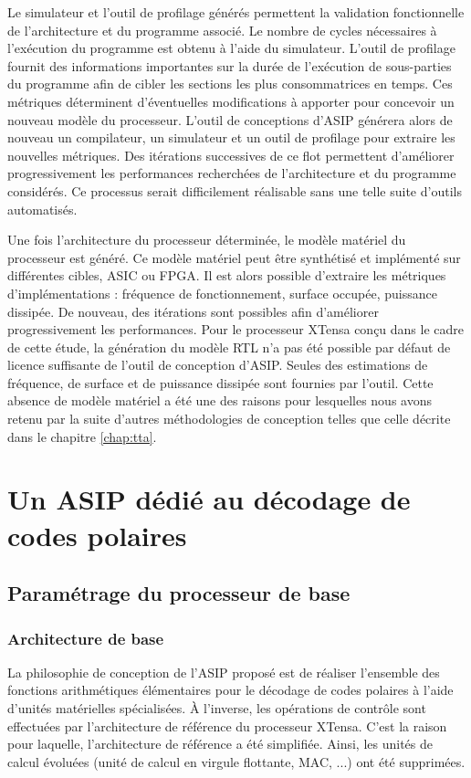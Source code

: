 Le simulateur et l'outil de profilage générés permettent la validation fonctionnelle de l'architecture et du programme associé. Le nombre de cycles nécessaires à l'exécution du programme est obtenu à l'aide du simulateur. L'outil de profilage fournit des informations importantes sur la durée de l'exécution de sous-parties du programme afin de cibler les sections les plus consommatrices en temps. Ces métriques déterminent d'éventuelles modifications à apporter pour concevoir un nouveau modèle du processeur. L'outil de conceptions d'ASIP générera alors de nouveau un compilateur, un simulateur et un outil de profilage pour extraire les nouvelles métriques. Des itérations successives de ce flot permettent d'améliorer progressivement les performances recherchées de l'architecture et du programme considérés. Ce processus serait difficilement réalisable sans une telle suite d'outils automatisés.

Une fois l'architecture du processeur déterminée, le modèle matériel du processeur est généré. Ce modèle matériel peut être synthétisé et implémenté sur différentes cibles, ASIC ou FPGA. Il est alors possible d'extraire les métriques d'implémentations : fréquence de fonctionnement, surface occupée, puissance dissipée. De nouveau, des itérations sont possibles afin d'améliorer progressivement les performances.
Pour le processeur XTensa conçu dans le cadre de cette étude, la génération du modèle RTL n'a pas été possible par défaut de licence suffisante de l'outil de conception d'ASIP. Seules des estimations de fréquence, de surface et de puissance dissipée sont fournies par l'outil. Cette absence de modèle matériel a été une des raisons pour lesquelles nous avons retenu par la suite d'autres méthodologies de conception telles que celle décrite dans le chapitre \ref{chap:tta}.

\section{Un ASIP dédié au décodage de codes polaires}
\label{sec:tensilica_design}
\subsection{Paramétrage du processeur de base}
\subsubsection{Architecture de base}
La philosophie de conception de l'ASIP proposé est de réaliser l'ensemble des fonctions arithmétiques élémentaires pour le décodage de codes polaires à l'aide d'unités matérielles spécialisées. \`A l'inverse, les opérations de contrôle sont effectuées par l'architecture de référence du processeur XTensa. C'est la raison pour laquelle, l'architecture de référence a été simplifiée. Ainsi, les unités de calcul évoluées (unité de calcul en virgule flottante, MAC, ...) ont été supprimées.

